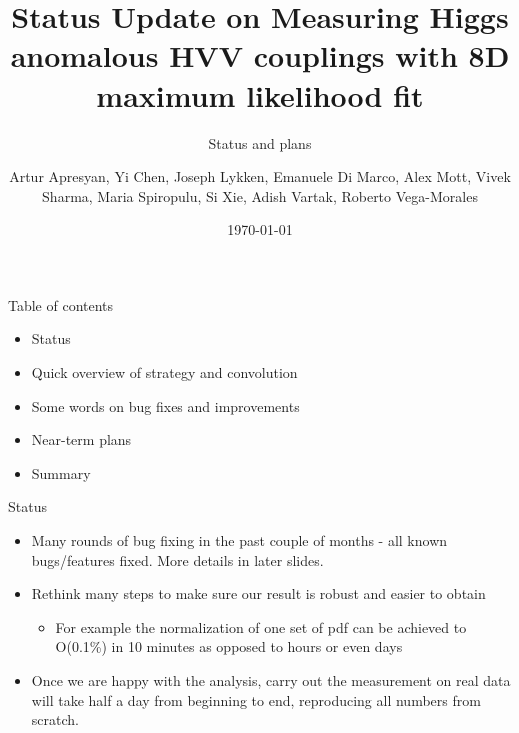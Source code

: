 \documentclass[11pt,t]{beamer}
\title{Status Update on Measuring Higgs anomalous HVV couplings with 8D maximum likelihood fit}
\subtitle{Status and plans}
\author{Artur Apresyan\inst{1}, Yi Chen\inst{1}, Joseph Lykken\inst{3}, Emanuele Di Marco\inst{1}, Alex Mott\inst{1}, Vivek Sharma\inst{2}, Maria Spiropulu\inst{1}, Si Xie\inst{1}, Adish Vartak\inst{2}, Roberto Vega-Morales\inst{3}}
\institute{\inst{1} Caltech, \inst{2} UCSD, \inst{3}FNAL}
\date{\today}
\begin{document}
\begin{frame}[plain]
   \titlepage
\end{frame}

\begin{frame}{Table of contents}
   \begin{itemize}
   \item Status
   \item Quick overview of strategy and convolution
   \item Some words on bug fixes and improvements
   \item Near-term plans
   \item Summary
   \end{itemize}
\end{frame}

\begin{frame}{Status}
   \begin{itemize}
   \item Many rounds of bug fixing in the past couple of months - all known bugs/features fixed.
   More details in later slides.
   \item Rethink many steps to make sure our result is robust and easier to obtain
      \begin{itemize}
      \item For example the normalization of one set of pdf can be achieved to O(0.1\%) in 10 minutes
      as opposed to hours or even days
      \end{itemize}
   \item Once we are happy with the analysis, carry out the measurement on real data
   will take half a day from beginning to end, reproducing all numbers from scratch.
   \end{itemize}
\end{frame}
\end{document}
